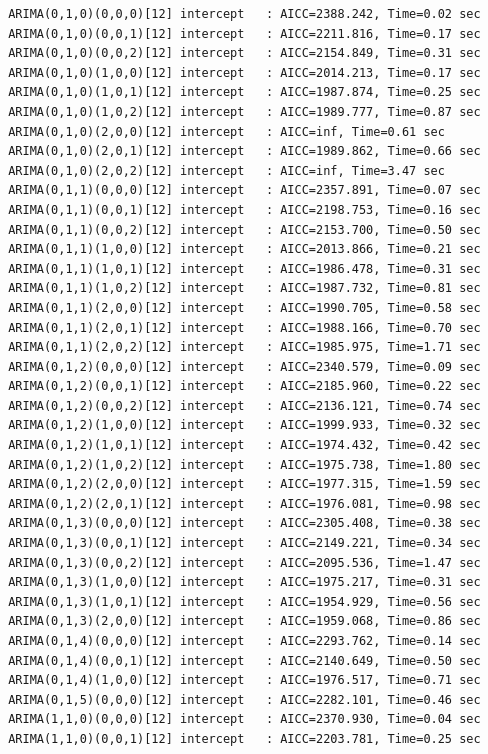 \documentclass[a4paper, 12pt]{article}
\begin{document}
\begin{verbatim}
 ARIMA(0,1,0)(0,0,0)[12] intercept   : AICC=2388.242, Time=0.02 sec
 ARIMA(0,1,0)(0,0,1)[12] intercept   : AICC=2211.816, Time=0.17 sec
 ARIMA(0,1,0)(0,0,2)[12] intercept   : AICC=2154.849, Time=0.31 sec
 ARIMA(0,1,0)(1,0,0)[12] intercept   : AICC=2014.213, Time=0.17 sec
 ARIMA(0,1,0)(1,0,1)[12] intercept   : AICC=1987.874, Time=0.25 sec
 ARIMA(0,1,0)(1,0,2)[12] intercept   : AICC=1989.777, Time=0.87 sec
 ARIMA(0,1,0)(2,0,0)[12] intercept   : AICC=inf, Time=0.61 sec
 ARIMA(0,1,0)(2,0,1)[12] intercept   : AICC=1989.862, Time=0.66 sec
 ARIMA(0,1,0)(2,0,2)[12] intercept   : AICC=inf, Time=3.47 sec
 ARIMA(0,1,1)(0,0,0)[12] intercept   : AICC=2357.891, Time=0.07 sec
 ARIMA(0,1,1)(0,0,1)[12] intercept   : AICC=2198.753, Time=0.16 sec
 ARIMA(0,1,1)(0,0,2)[12] intercept   : AICC=2153.700, Time=0.50 sec
 ARIMA(0,1,1)(1,0,0)[12] intercept   : AICC=2013.866, Time=0.21 sec
 ARIMA(0,1,1)(1,0,1)[12] intercept   : AICC=1986.478, Time=0.31 sec
 ARIMA(0,1,1)(1,0,2)[12] intercept   : AICC=1987.732, Time=0.81 sec
 ARIMA(0,1,1)(2,0,0)[12] intercept   : AICC=1990.705, Time=0.58 sec
 ARIMA(0,1,1)(2,0,1)[12] intercept   : AICC=1988.166, Time=0.70 sec
 ARIMA(0,1,1)(2,0,2)[12] intercept   : AICC=1985.975, Time=1.71 sec
 ARIMA(0,1,2)(0,0,0)[12] intercept   : AICC=2340.579, Time=0.09 sec
 ARIMA(0,1,2)(0,0,1)[12] intercept   : AICC=2185.960, Time=0.22 sec
 ARIMA(0,1,2)(0,0,2)[12] intercept   : AICC=2136.121, Time=0.74 sec
 ARIMA(0,1,2)(1,0,0)[12] intercept   : AICC=1999.933, Time=0.32 sec
 ARIMA(0,1,2)(1,0,1)[12] intercept   : AICC=1974.432, Time=0.42 sec
 ARIMA(0,1,2)(1,0,2)[12] intercept   : AICC=1975.738, Time=1.80 sec
 ARIMA(0,1,2)(2,0,0)[12] intercept   : AICC=1977.315, Time=1.59 sec
 ARIMA(0,1,2)(2,0,1)[12] intercept   : AICC=1976.081, Time=0.98 sec
 ARIMA(0,1,3)(0,0,0)[12] intercept   : AICC=2305.408, Time=0.38 sec
 ARIMA(0,1,3)(0,0,1)[12] intercept   : AICC=2149.221, Time=0.34 sec
 ARIMA(0,1,3)(0,0,2)[12] intercept   : AICC=2095.536, Time=1.47 sec
 ARIMA(0,1,3)(1,0,0)[12] intercept   : AICC=1975.217, Time=0.31 sec
 ARIMA(0,1,3)(1,0,1)[12] intercept   : AICC=1954.929, Time=0.56 sec
 ARIMA(0,1,3)(2,0,0)[12] intercept   : AICC=1959.068, Time=0.86 sec
 ARIMA(0,1,4)(0,0,0)[12] intercept   : AICC=2293.762, Time=0.14 sec
 ARIMA(0,1,4)(0,0,1)[12] intercept   : AICC=2140.649, Time=0.50 sec
 ARIMA(0,1,4)(1,0,0)[12] intercept   : AICC=1976.517, Time=0.71 sec
 ARIMA(0,1,5)(0,0,0)[12] intercept   : AICC=2282.101, Time=0.46 sec
 ARIMA(1,1,0)(0,0,0)[12] intercept   : AICC=2370.930, Time=0.04 sec
 ARIMA(1,1,0)(0,0,1)[12] intercept   : AICC=2203.781, Time=0.25 sec

\end{verbatim}
\end{document}
